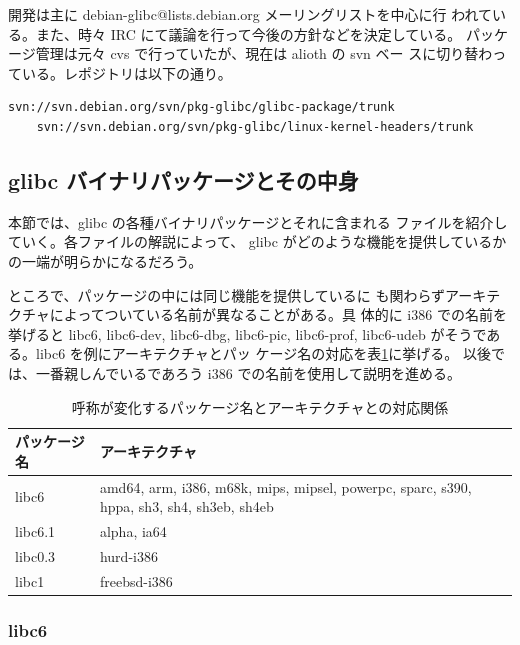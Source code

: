\documentclass[mingoth]{jsarticle}
\begin{document}
    開発は主に debian-glibc@lists.debian.org メーリングリストを中心に行
    われている。また、時々 IRC にて議論を行って今後の方針などを決定している。
    パッケージ管理は元々 cvs で行っていたが、現在は alioth の svn ベー
    スに切り替わっている。レポジトリは以下の通り。

	\begin{Verbatim}[frame=single]
	svn://svn.debian.org/svn/pkg-glibc/glibc-package/trunk
	svn://svn.debian.org/svn/pkg-glibc/linux-kernel-headers/trunk
	\end{Verbatim}

\subsection{glibc バイナリパッケージとその中身}

    本節では、glibc の各種バイナリパッケージとそれに含まれる
    ファイルを紹介していく。各ファイルの解説によって、
    glibc がどのような機能を提供しているかの一端が明らかになるだろう。

    ところで、パッケージの中には同じ機能を提供しているに
    も関わらずアーキテクチャによってついている名前が異なることがある。具
    体的に i386 での名前を挙げると libc6, libc6-dev, libc6-dbg, libc6-pic,
    libc6-prof, libc6-udeb がそうである。libc6 を例にアーキテクチャとパッ
    ケージ名の対応を表\ref{archname}に挙げる。
    以後では、一番親しんでいるであろう i386 での名前を使用して説明を進める。

    \begin{table}[h]
    \begin{center}
      {
	\begin{tabular}{l|l} \hline
		パッケージ名 & アーキテクチャ \\ \hline \hline
		libc6 & amd64, arm, i386, m68k, mips, mipsel, powerpc, sparc, s390, hppa, sh3, sh4, sh3eb, sh4eb	\\
		libc6.1 & alpha, ia64 \\
		libc0.3 & hurd-i386 \\
		libc1   & freebsd-i386 \\ \hline
	   \end{tabular}
	}
     \caption{呼称が変化するパッケージ名とアーキテクチャとの対応関係}
     \label{archname}
    \end{center}
    \end{table}

  \subsubsection{libc6}
\end{document}
